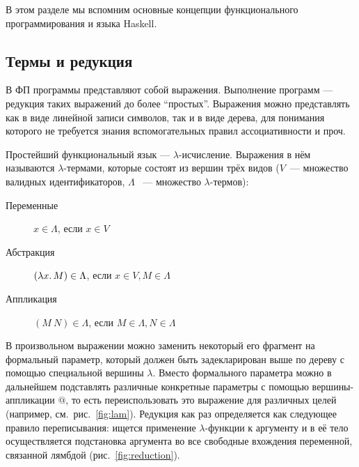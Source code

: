 
В этом разделе мы вспомним основные концепции функционального программирования и языка Haskell.

\subsection{Термы и редукция} \label{subsec:terms-reduction}

В ФП программы представляют собой выражения.
Выполнение программ --- редукция таких выражений до более ``простых''.
Выражения можно представлять как в виде линейной записи символов, так и в виде дерева, для понимания которого не требуется знания вспомогательных правил ассоциативности и проч.

Простейший функциональный язык --- $\lambda$-исчисление.
Выражения в нём называются $\lambda$-термами, которые состоят из вершин трёх видов ($V$~--- множество валидных идентификаторов, $\Lambda$ ~--- множество $\lambda$-термов):
\begin{description}
    \item[Переменные] $x \in \Lambda$, если $x \in V$ \hspace{2em}
    \item[Абстракция] $(\lambda x\ldotp M) \in \Lambda$, если $x \in V, M \in \Lambda$ \hspace{2em}
    \item[Аппликация] $(M~N) \in \Lambda$, если $M \in \Lambda, N \in \Lambda$ \hspace{2em}
\end{description}

В произвольном выражении можно заменить некоторый его фрагмент на формальный параметр, который должен быть задекларирован выше по дереву с помощью специальной вершины $\lambda$.
Вместо формального параметра можно в дальнейшем подставлять различные конкретные параметры с помощью вершины-аппликации $@$, то есть переиспользовать это выражение для различных целей (например, см.\ рис.\ \ref{fig:lam}).
Редукция как раз определяется как следующее правило переписывания: ищется применение $\lambda$-функции к аргументу и в её тело осуществляется подстановка аргумента во все свободные вхождения переменной, связанной лямбдой (рис.\ \ref{fig:reduction}).

